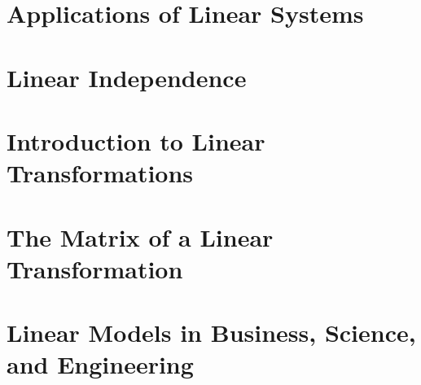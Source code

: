 \documentclass[../linalg.tex]{subfiles}
\begin{document}
\section{Applications of Linear Systems}
\section{Linear Independence}
\section{Introduction to Linear Transformations}
\section{The Matrix of a Linear Transformation}
\section{Linear Models in Business, Science, and Engineering}
\end{document}
